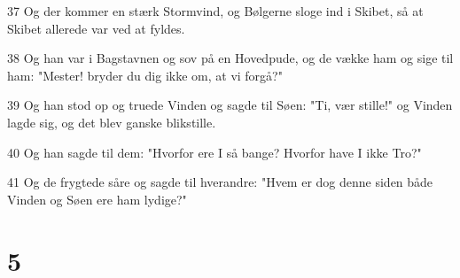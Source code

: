 \par 37 Og der kommer en stærk Stormvind, og Bølgerne sloge ind i Skibet, så at Skibet allerede var ved at fyldes.
\par 38 Og han var i Bagstavnen og sov på en Hovedpude, og de vække ham og sige til ham: "Mester! bryder du dig ikke om, at vi forgå?"
\par 39 Og han stod op og truede Vinden og sagde til Søen: "Ti, vær stille!" og Vinden lagde sig, og det blev ganske blikstille.
\par 40 Og han sagde til dem: "Hvorfor ere I så bange? Hvorfor have I ikke Tro?"
\par 41 Og de frygtede såre og sagde til hverandre: "Hvem er dog denne siden både Vinden og Søen ere ham lydige?"

\chapter{5}

